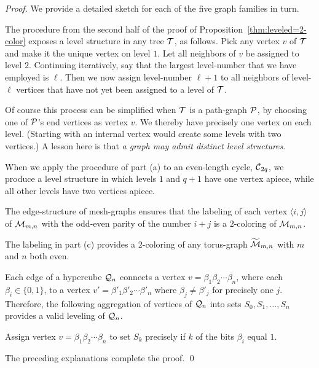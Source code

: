 \begin{proof}
We provide a detailed sketch for each of the five graph families in turn.

\smallskip

The procedure from the second half of the proof of Proposition~\ref{thm:leveled=2-color} exposes a level structure in any tree $\mbox{$\cal T$}$, as follows.  Pick any vertex $v$ of $\mbox{$\cal T$}$ and make it the
unique vertex on level $1$.  Let all neighbors of $v$ be assigned to level $2$.  Continuing iteratively, say that the largest level-number that we have employed is $\ell$.  Then we now assign level-number $\ell +1$ to all neighbors of level-$\ell$ vertices that have not yet been
assigned to a level of $\mbox{$\cal T$}$.

\smallskip

Of course this process can be simplified when $\mbox{$\cal T$}$ is a path-graph $\mbox{$\cal P$}$, by choosing one of $\mbox{$\cal P$}$'s end vertices as vertex $v$.  We thereby have precisely one vertex on each level.  (Starting with an internal vertex would create some levels with two vertices.)  A lesson here is that {\em a graph may admit distinct level structures}.

\medskip

When we apply the procedure of part (a) to an even-length cycle, $\mbox{$\cal C$}_{2q}$, we produce a level structure in which levels $1$ and $q+1$ have one vertex apiece, while all other levels have two vertices apiece.

\medskip

The edge-structure of mesh-graphs ensures that the labeling of each vertex $\langle i,j \rangle$ of $\mbox{$\cal M$}_{m,n}$ with the odd-even parity of the number $i+j$ is a $2$-coloring of $\mbox{$\cal M$}_{m,n}$.

\medskip

The labeling in part (c) provides a $2$-coloring of any torus-graph $\widetilde{\mbox{$\cal M$}}_{m,n}$ with $m$ and $n$ both even.

\medskip

Each edge of a hypercube $\mbox{$\cal Q$}_n$ connects a vertex $v = \beta_1 \beta_2 \cdots \beta_n$, where each $\beta_i \in \{0,1\}$, to a vertex $v' = \beta'_1 \beta'_2 \cdots \beta'_n$ where  $\beta_j \neq \beta'_j$ for precisely one $j$.  Therefore, the following aggregation of vertices of $\mbox{$\cal Q$}_n$ into sets $S_0, S_1, \ldots, S_n$ provides a valid leveling of $\mbox{$\cal Q$}_n$.

\smallskip

Assign vertex $v = \beta_1 \beta_2 \cdots \beta_n$ to set $S_k$ precisely if $k$ of the bits $\beta_i$ equal $1$.

\medskip

\noindent
The preceding explanations complete the proof. \qed
\end{proof}


